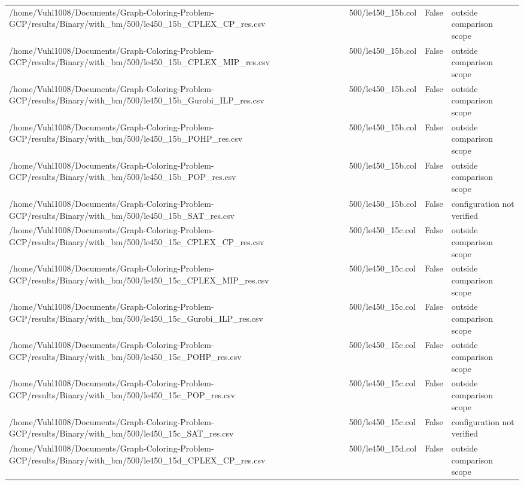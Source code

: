 \begin{table}[htbp]
\begin{tabular}{llll}
/home/Vuhl1008/Documents/Graph-Coloring-Problem-GCP/results/Binary/with\_bm/500/le450\_15b\_CPLEX\_CP\_res.csv & 500/le450\_15b.col & False & outside comparison scope \\
/home/Vuhl1008/Documents/Graph-Coloring-Problem-GCP/results/Binary/with\_bm/500/le450\_15b\_CPLEX\_MIP\_res.csv & 500/le450\_15b.col & False & outside comparison scope \\
/home/Vuhl1008/Documents/Graph-Coloring-Problem-GCP/results/Binary/with\_bm/500/le450\_15b\_Gurobi\_ILP\_res.csv & 500/le450\_15b.col & False & outside comparison scope \\
/home/Vuhl1008/Documents/Graph-Coloring-Problem-GCP/results/Binary/with\_bm/500/le450\_15b\_POHP\_res.csv & 500/le450\_15b.col & False & outside comparison scope \\
/home/Vuhl1008/Documents/Graph-Coloring-Problem-GCP/results/Binary/with\_bm/500/le450\_15b\_POP\_res.csv & 500/le450\_15b.col & False & outside comparison scope \\
/home/Vuhl1008/Documents/Graph-Coloring-Problem-GCP/results/Binary/with\_bm/500/le450\_15b\_SAT\_res.csv & 500/le450\_15b.col & False & configuration not verified \\
/home/Vuhl1008/Documents/Graph-Coloring-Problem-GCP/results/Binary/with\_bm/500/le450\_15c\_CPLEX\_CP\_res.csv & 500/le450\_15c.col & False & outside comparison scope \\
/home/Vuhl1008/Documents/Graph-Coloring-Problem-GCP/results/Binary/with\_bm/500/le450\_15c\_CPLEX\_MIP\_res.csv & 500/le450\_15c.col & False & outside comparison scope \\
/home/Vuhl1008/Documents/Graph-Coloring-Problem-GCP/results/Binary/with\_bm/500/le450\_15c\_Gurobi\_ILP\_res.csv & 500/le450\_15c.col & False & outside comparison scope \\
/home/Vuhl1008/Documents/Graph-Coloring-Problem-GCP/results/Binary/with\_bm/500/le450\_15c\_POHP\_res.csv & 500/le450\_15c.col & False & outside comparison scope \\
/home/Vuhl1008/Documents/Graph-Coloring-Problem-GCP/results/Binary/with\_bm/500/le450\_15c\_POP\_res.csv & 500/le450\_15c.col & False & outside comparison scope \\
/home/Vuhl1008/Documents/Graph-Coloring-Problem-GCP/results/Binary/with\_bm/500/le450\_15c\_SAT\_res.csv & 500/le450\_15c.col & False & configuration not verified \\
/home/Vuhl1008/Documents/Graph-Coloring-Problem-GCP/results/Binary/with\_bm/500/le450\_15d\_CPLEX\_CP\_res.csv & 500/le450\_15d.col & False & outside comparison scope \\

\end{tabular}
\end{table}
